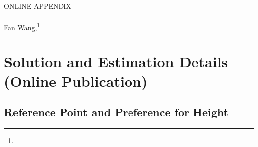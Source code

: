 \setcounter{page}{1}

\renewcommand*{\thefootnote}{\fnsymbol{footnote}}
\begingroup
  \doublespacing
  \centering
  \Large ONLINE APPENDIX \\[1.5em]
  \LARGE \PAPERTITLE \\[0.75em]
  \large
    Fan Wang,\footnote[1]{\AUTHORWANG}\\[1.0em]
\endgroup
\clearpage


\renewcommand{\thefigure}{A.\arabic{figure}}
\setcounter{figure}{0}
\renewcommand{\thetable}{A.\arabic{table}}
\setcounter{table}{0}
\renewcommand{\theequation}{A.\arabic{equation}}
\setcounter{equation}{0}
\renewcommand{\thefootnote}{A.\arabic{footnote}}
\setcounter{footnote}{0}

\section{Solution and Estimation Details (Online Publication)}

\subsection{Reference Point and Preference for Height \label{sec:apprefsd}}

